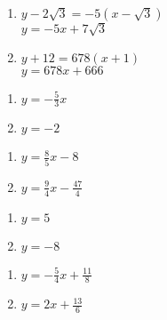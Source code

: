 \documentclass{ximera}
\begin{document}
\begin{multicols}{2}
\begin{enumerate}
\setcounter{enumi}{\value{HW}}

\item $y - 2\sqrt{3} = -5(x - \sqrt{3})$ \\ $y = -5x + 7\sqrt{3}$ 
\item $y + 12 = 678(x + 1)$ \\ $y = 678x + 666$

\setcounter{HW}{\value{enumi}}
\end{enumerate}
\end{multicols}


\begin{multicols}{2}
\begin{enumerate}
\setcounter{enumi}{\value{HW}}

\item $y = -\frac{5}{3}x$
\item $y = -2$

\setcounter{HW}{\value{enumi}}
\end{enumerate}
\end{multicols}


\begin{multicols}{2}
\begin{enumerate}
\setcounter{enumi}{\value{HW}}

\item $y = \frac{8}{5}x - 8$ 
\item $y = \frac{9}{4}x - \frac{47}{4}$

\setcounter{HW}{\value{enumi}}
\end{enumerate}
\end{multicols}


\begin{multicols}{2}
\begin{enumerate}
\setcounter{enumi}{\value{HW}}

\item $y = 5$
\item $y = -8$

\setcounter{HW}{\value{enumi}}
\end{enumerate}
\end{multicols}

\begin{multicols}{2}
\begin{enumerate}
\setcounter{enumi}{\value{HW}}

\item $y = -\frac{5}{4} x + \frac{11}{8}$ 
\item $y = 2x + \frac{13}{6}$ 

\setcounter{HW}{\value{enumi}}
\end{enumerate}
\end{multicols}
\end{document}
